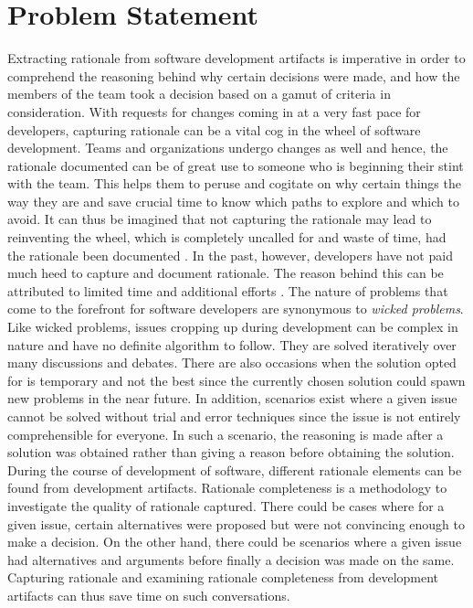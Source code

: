 \documentclass[a4paper,12pt,twoside]{report}
\begin{document}
\section{Problem Statement}
Extracting rationale from software development artifacts is imperative in order to comprehend the reasoning behind why certain decisions were made, and how the members of the team took a decision based on a gamut of criteria in consideration. With requests for changes coming in at a very fast pace for developers, capturing rationale can be a vital cog in the wheel of software development. Teams and organizations undergo changes as well and hence, the rationale documented can be of great use to someone who is beginning their stint with the team. This helps them to peruse and cogitate on why certain things the way they are and save crucial time to know which paths to explore and which to avoid. It can thus be imagined that not capturing the rationale may lead to reinventing the wheel, which is completely uncalled for and waste of time, had the rationale been documented \cite{Bruegge2009}. In the past, however, developers have not paid much heed to capture and document rationale. The reason behind this can be attributed to limited time and additional efforts \cite{Dutoit2006}. 
\newline \newline
The nature of problems that come to the forefront for software developers are synonymous to \textit{wicked problems}\cite{Rittel1973}. Like wicked problems, issues cropping up during development can be complex in nature and have no definite algorithm to follow. They are solved iteratively over many discussions and debates. There are also occasions when the solution opted for is temporary and not the best since the currently chosen solution could spawn new problems in the near future. In addition, scenarios exist where a given issue cannot be solved without trial and error techniques since the issue is not entirely comprehensible for everyone. In such a scenario, the reasoning is made after a solution was obtained rather than giving a reason before obtaining the solution. 
\newline \newline
During the course of development of software, different rationale elements can be found from development artifacts. Rationale completeness is a methodology to investigate the quality of rationale captured. There could be cases where for a given issue, certain alternatives were proposed but were not convincing enough to make a decision. On the other hand, there could be scenarios where a given issue had alternatives and arguments before finally a decision was made on the same. Capturing rationale and examining rationale completeness from development artifacts can thus save time on such conversations. 
\end{document}
